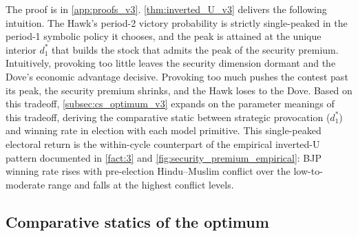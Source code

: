 \documentclass[11pt,twoside]{extarticle}
\begin{document}
The proof is in \autoref{app:proofs_v3}.
\autoref{thm:inverted_U_v3} delivers the following intuition. The Hawk's period-2 victory probability is strictly single-peaked in the period-1 symbolic policy it chooses, and the peak is attained at the unique interior $d_1^*$ that builds the stock that admits the peak of the security premium. Intuitively, provoking too little leaves the security dimension dormant and the Dove's economic advantage decisive. Provoking too much pushes the contest past its peak, the security premium shrinks, and the Hawk loses to the Dove. Based on this tradeoff, \autoref{subsec:cs_optimum_v3} expands on the parameter meanings of this tradeoff, deriving the comparative static between strategic provocation ($d_1^*$) and winning rate in election with each model primitive. This single-peaked electoral return is the within-cycle counterpart of the empirical inverted-U pattern documented in \autoref{fact:3} and \autoref{fig:security_premium_empirical}: BJP winning rate rises with pre-election Hindu--Muslim conflict over the low-to-moderate range and falls at the highest conflict levels.

\subsection{Comparative statics of the optimum}\label{subsec:cs_optimum_v3}
\end{document}

